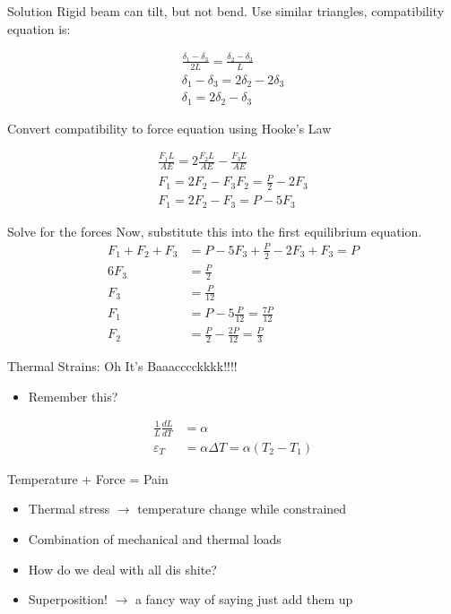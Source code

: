 \documentclass[10pt, svgnames]{beamer}
\begin{document}
\begin{frame}[label={sec:org023fa0d}]{Solution}
Rigid beam can tilt, but not bend. Use similar triangles, compatibility equation is:

\begin{align*}
    \frac{\delta_1 - \delta_3}{2L} = \frac{\delta_2 - \delta_3}{L} \\
    \delta_1 - \delta_3 = 2\delta_2 - 2\delta_3 \\
    \delta_1 = 2\delta_2 - \delta_3
\end{align*}

Convert compatibility to force equation using Hooke's Law

\begin{gather*}
    \frac{F_1 L}{AE} = 2\frac{F_2 L}{AE} - \frac{F_3 L}{AE} \\
    F_1 = 2F_2 - F_3
    F_2 = \frac{P}{2} - 2F_3 \\
    F_1 = 2F_2 - F_3 = P - 5F_3
\end{gather*}
\end{frame}

\begin{frame}[label={sec:org882323e}]{Solve for the forces}
Now, substitute this into the first equilibrium equation.
\begin{align*}
   F_1 + F_2 + F_3 &= P - 5F_3 + \frac{P}{2} - 2F_3 + F_3 = P \\
   6F_3 &= \frac{P}{2} \\
   F_3 &= \frac{P}{12} \\
   F_1 &= P - 5 \frac{P}{12} = \frac{7P}{12} \\
   F_2 &= \frac{P}{2} - \frac{2P}{12} = \frac{P}{3}
\end{align*}
\end{frame}

\begin{frame}[label={sec:orgb7a8aa5}]{Thermal Strains: Oh It's Baaacccckkkk!!!!}
\begin{itemize}
\item Remember this?
\end{itemize}

\begin{align*}
  \frac{1}{L}\frac{dL}{dT} &= \alpha \\
  \varepsilon_T &= \alpha \Delta T = \alpha \left( T_2 - T_1 \right)
\end{align*}
\end{frame}

\begin{frame}[label={sec:org07f23dc}]{Temperature + Force = Pain}
\begin{itemize}
\item Thermal stress \(\rightarrow\) temperature change while constrained

\item Combination of mechanical and thermal loads

\item How do we deal with all dis shite?

\item Superposition! \(\rightarrow\) a fancy way of saying just add them up
\end{itemize}
\end{frame}
\end{document}
